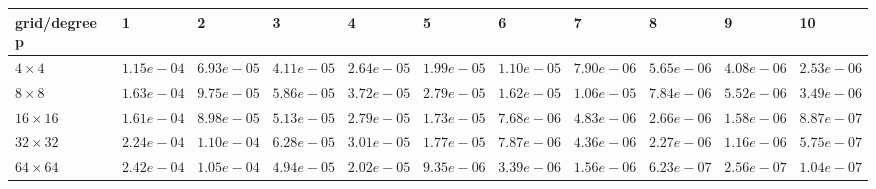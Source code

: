 \begin{tabular}{lllllllllll}
\hline
 grid/degree p   & 1          & 2          & 3          & 4          & 5          & 6          & 7          & 8          & 9          & 10         \\
\hline
 $4 \times 4$    & $1.15e-04$ & $6.93e-05$ & $4.11e-05$ & $2.64e-05$ & $1.99e-05$ & $1.10e-05$ & $7.90e-06$ & $5.65e-06$ & $4.08e-06$ & $2.53e-06$ \\
 $8 \times 8$    & $1.63e-04$ & $9.75e-05$ & $5.86e-05$ & $3.72e-05$ & $2.79e-05$ & $1.62e-05$ & $1.06e-05$ & $7.84e-06$ & $5.52e-06$ & $3.49e-06$ \\
 $16 \times 16$  & $1.61e-04$ & $8.98e-05$ & $5.13e-05$ & $2.79e-05$ & $1.73e-05$ & $7.68e-06$ & $4.83e-06$ & $2.66e-06$ & $1.58e-06$ & $8.87e-07$ \\
 $32 \times 32$  & $2.24e-04$ & $1.10e-04$ & $6.28e-05$ & $3.01e-05$ & $1.77e-05$ & $7.87e-06$ & $4.36e-06$ & $2.27e-06$ & $1.16e-06$ & $5.75e-07$ \\
 $64 \times 64$  & $2.42e-04$ & $1.05e-04$ & $4.94e-05$ & $2.02e-05$ & $9.35e-06$ & $3.39e-06$ & $1.56e-06$ & $6.23e-07$ & $2.56e-07$ & $1.04e-07$ \\
\hline
\end{tabular}